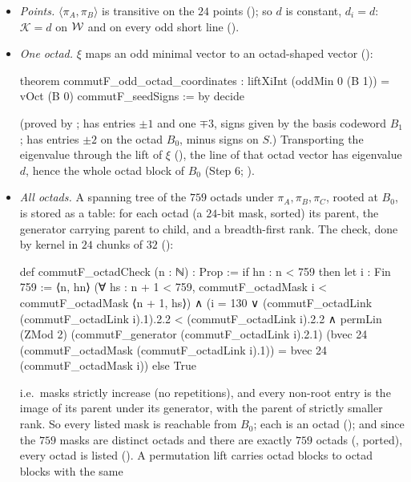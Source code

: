 \begin{itemize}
\item \emph{Points.}  $\langle\pi_A,\pi_B\rangle$ is transitive on the $24$ points (); so $d$ is
  constant, $d_i=d$: $\mathcal K=d$ on $\mathcal{W}$ and on every odd short line ().
\item \emph{One octad.}  $\xi$ maps an odd minimal vector to an octad-shaped vector
  ():
\begin{leancode}
theorem commutF_odd_octad_coordinates :
    liftXiInt (oddMin 0 (B 1)) = vOct (B 0) commutF_seedSigns := by decide
\end{leancode}
  (proved by ;  has entries $\pm1$ and one $\mp3$, signs given by the basis codeword $B_1$;
   has entries $\pm2$ on the octad $B_0$, minus signs on $S$.)  Transporting the eigenvalue through the lift
  of $\xi$ (), the line of that octad vector has eigenvalue $d$, hence the whole octad block of $B_0$
  (Step 6; ).
\item \emph{All octads.}  A spanning tree of the $759$ octads under $\pi_A,\pi_B,\pi_C$, rooted at $B_0$, is stored as a table: for
  each octad (a $24$-bit mask, sorted) its parent, the generator carrying parent to child, and a breadth-first rank.  The check,
  done by kernel  in $24$ chunks of $32$ ():
\begin{leancode}
def commutF_octadCheck (n : ℕ) : Prop :=
  if hn : n < 759 then
    let i : Fin 759 := ⟨n, hn⟩
    (∀ hs : n + 1 < 759, commutF_octadMask i < commutF_octadMask ⟨n + 1, hs⟩) ∧
    (i = 130 ∨
      (commutF_octadLink (commutF_octadLink i).1).2.2 < (commutF_octadLink i).2.2 ∧
      permLin (ZMod 2) (commutF_generator (commutF_octadLink i).2.1)
        (bvec 24 (commutF_octadMask (commutF_octadLink i).1)) =
          bvec 24 (commutF_octadMask i))
  else True
\end{leancode}
  i.e.\ masks strictly increase (no repetitions), and every non-root entry is the image of its parent under its generator, with
  the parent of strictly smaller rank.  So every listed mask is reachable from $B_0$; each is an octad ();
  and since the $759$ masks are distinct octads and there are exactly $759$ octads (, ported), every octad
  is listed ().  A permutation lift carries octad blocks to octad blocks with the same

\end{itemize}
